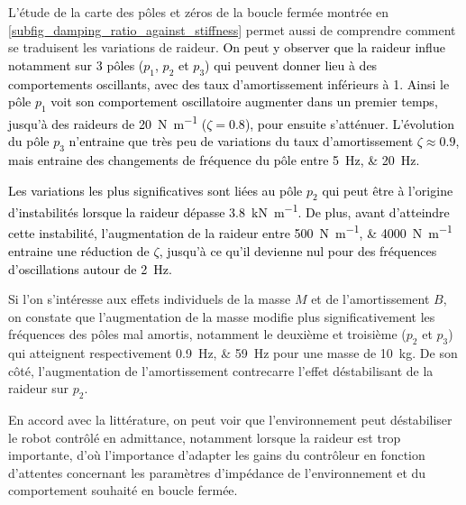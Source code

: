L'étude de la carte des pôles et zéros de la boucle fermée montrée en \cref{subfig_damping_ratio_against_stiffness} permet aussi de comprendre comment se traduisent les variations de raideur. %
% 
\textcolor{black}{On peut y observer que la raideur influe notamment sur 3 pôles ($p_1$, $p_2$ et $p_3$) qui peuvent donner lieu à des comportements oscillants, avec des taux d'amortissement inférieurs à 1. Ainsi le pôle $p_1$ voit son comportement oscillatoire augmenter dans un premier temps, jusqu'à des raideurs de \SI{20}{\newton\per\meter} ($\zeta=0.8$), pour ensuite s'atténuer. L'évolution du pôle $p_3$ n'entraine que très peu de variations du taux d'amortissement $\zeta\approx0.9$, mais entraine des changements de fréquence du pôle entre \SIlist{5;20}{\hertz}.}

\textcolor{black}{Les variations les plus significatives sont liées au pôle $p_2$ qui peut être à l'origine d'instabilités lorsque la raideur dépasse \SI{3.8}{\kilo\newton\per\meter}. De plus, avant d'atteindre cette instabilité, l'augmentation de la raideur entre \SIlist{500;4000}{\newton\per\meter} entraine une réduction de $\zeta$, jusqu'à ce qu'il devienne nul pour des fréquences d'oscillations autour de \SI{2}{\hertz}.}




Si l'on s'intéresse aux effets individuels de la masse $M$ et de l'amortissement $B$, on constate que l'augmentation de la masse modifie plus significativement les fréquences des pôles mal amortis, notamment le deuxième et troisième ($p_2$ et $p_3$) qui atteignent respectivement \SIlist{0.9;59}{\hertz} pour une masse de \SI{10}{\kilogram}. De son côté, l'augmentation de l'amortissement contrecarre l'effet déstabilisant de la raideur sur $p_2$.

En accord avec la littérature, on peut voir que l'environnement peut déstabiliser le robot contrôlé en admittance, notamment lorsque la raideur est trop importante, d'où l'importance d'adapter les gains du contrôleur en fonction d'attentes concernant les paramètres d'impédance de l'environnement et du comportement souhaité en boucle fermée.

